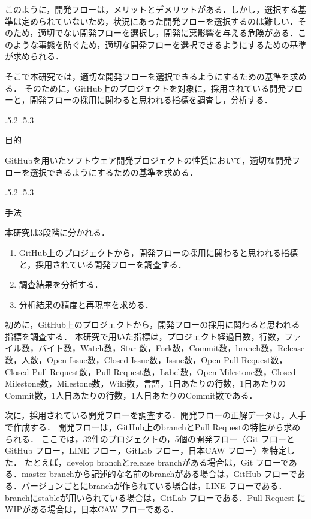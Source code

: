 \documentclass[uplatex,twocolumn]{jsarticle}
\makeatletter
\renewcommand{\section}{%
    \if@slide\clearpage\fi
    \@startsection{section}{1}{\z@}%
    {\Cvs \@plus.5\Cdp \@minus.2\Cdp}%
    {.5\Cvs \@plus.3\Cdp}%
    {\normalfont\raggedright}}
\makeatother
\begin{document}
このように，開発フローは，メリットとデメリットがある．しかし，選択する基準は定められていないため，状況にあった開発フローを選択するのは難しい．そのため，適切でない開発フローを選択し，開発に悪影響を与える危険がある．このような事態を防ぐため，適切な開発フローを選択できるようにするための基準が求められる．


そこで本研究では，適切な開発フローを選択できるようにするための基準を求める．
そのために，GitHub上のプロジェクトを対象に，採用されている開発フローと，開発フローの採用に関わると思われる指標を調査し，分析する．

\section{目的}

GitHubを用いたソフトウェア開発プロジェクトの性質において，適切な開発フローを選択できるようにするための基準を求める．

\section{手法}


本研究は3段階に分かれる．
\begin{enumerate}
\item GitHub上のプロジェクトから，開発フローの採用に関わると思われる指標と，採用されている開発フローを調査する．
\item 調査結果を分析する．
\item 分析結果の精度と再現率を求める． 
\end{enumerate}

初めに，GitHub上のプロジェクトから，開発フローの採用に関わると思われる指標を調査する．
本研究で用いた指標は，プロジェクト経過日数，行数，ファイル数，バイト数，Watch数，Star 数，Fork数，Commit数，branch数，Release数，人数，Open Issue数，Closed Issue数，Issue数，Open Pull Request数，Closed Pull Request数，Pull Request数，Label数，Open Milestone数，Closed Milestone数，Milestone数，Wiki数，言語，1日あたりの行数，1日あたりのCommit数，1人日あたりの行数，1人日あたりのCommit数である．

次に，採用されている開発フローを調査する．開発フローの正解データは，人手で作成する．
開発フローは，GitHub上のbranchとPull Requestの特性から求められる．
ここでは，32件のプロジェクトの，5個の開発フロー（Git フローとGitHub フロー，LINE フロー，GitLab フロー，日本CAW フロー）を特定した．
たとえば，develop branchとrelease branchがある場合は，Git フローである．master branchから記述的な名前のbranchがある場合は，GitHub フローである．バージョンごとにbranchが作られている場合は，LINE フローである．branchにstableが用いられている場合は，GitLab フローである．Pull Request にWIPがある場合は，日本CAW フローである．
\end{document}
